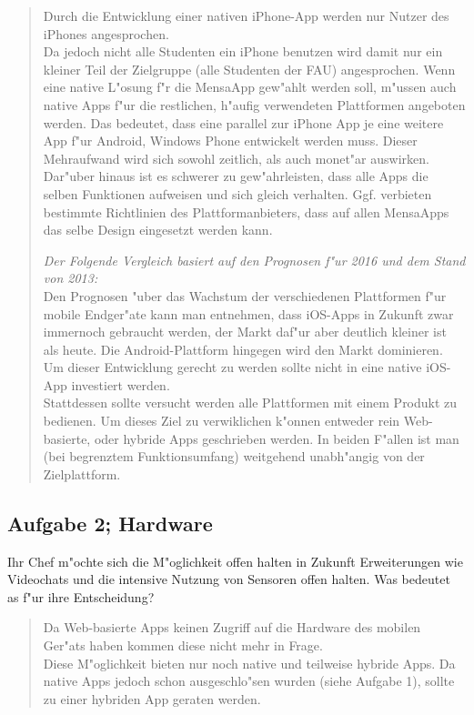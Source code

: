 \begin{quote}
    Durch die Entwicklung einer nativen iPhone-App werden nur Nutzer des iPhones angesprochen.\\
    Da jedoch nicht alle Studenten ein iPhone benutzen wird damit nur ein kleiner Teil der Zielgruppe (alle Studenten der FAU) angesprochen.
    Wenn eine native L"osung f"r die MensaApp gew"ahlt werden soll, m"ussen auch native Apps f"ur die restlichen, h"aufig verwendeten Plattformen angeboten werden.
    Das bedeutet, dass eine parallel zur iPhone App je eine weitere App f"ur Android, Windows Phone entwickelt werden muss.
    Dieser Mehraufwand wird sich sowohl zeitlich, als auch monet"ar auswirken.
    Dar"uber hinaus ist es schwerer zu gew"ahrleisten, dass alle Apps die selben Funktionen aufweisen und sich gleich verhalten.
    Ggf. verbieten bestimmte Richtlinien des Plattformanbieters, dass auf allen MensaApps das selbe Design eingesetzt werden kann.

    \noindent
    \emph{Der Folgende Vergleich basiert auf den Prognosen f"ur 2016 und dem Stand von 2013:}\\
    Den Prognosen "uber das Wachstum der verschiedenen Plattformen f"ur mobile Endger"ate kann man entnehmen, dass iOS-Apps in Zukunft zwar immernoch gebraucht werden, der Markt daf"ur aber deutlich kleiner ist als heute.
    Die Android-Plattform hingegen wird den Markt dominieren.
    Um dieser Entwicklung gerecht zu werden sollte nicht in eine native iOS-App investiert werden.\\
    Stattdessen sollte versucht werden alle Plattformen mit einem Produkt zu bedienen.
    Um dieses Ziel zu verwiklichen k"onnen entweder rein Web-basierte, oder hybride  Apps geschrieben werden.
    In beiden F"allen ist man (bei begrenztem Funktionsumfang) weitgehend unabh"angig von der Zielplattform.
\end{quote}

\subsection{Aufgabe 2; Hardware}
Ihr Chef m"ochte sich die M"oglichkeit offen halten in Zukunft Erweiterungen wie Videochats und die intensive Nutzung von Sensoren offen halten.
Was bedeutet as f"ur ihre Entscheidung?
\begin{quote}
    Da Web-basierte Apps keinen Zugriff auf die Hardware des mobilen Ger"ats haben kommen diese nicht mehr in Frage.\\
    Diese M"oglichkeit bieten nur noch native und teilweise hybride Apps.
    Da native Apps jedoch schon ausgeschlo"sen wurden (siehe Aufgabe 1), sollte zu einer hybriden App geraten werden.
\end{quote}

